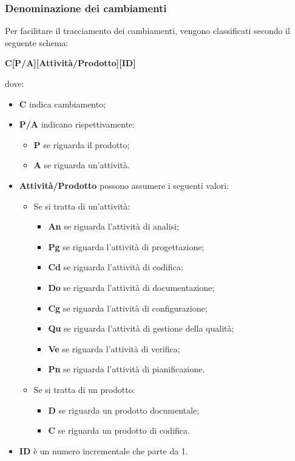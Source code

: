 \subsubsection{Denominazione dei cambiamenti}\label{NomeCambiamenti}
Per facilitare il tracciamento dei cambiamenti, vengono classificati secondo il seguente schema:
\begin{center}
	\textbf{C[P/A][Attività/Prodotto][ID]}
\end{center} 
dove:
\begin{itemize}
	\item \textbf{C} indica cambiamento;
	\item \textbf{P/A} indicano rispettivamente:
	\begin{itemize}
		\item \textbf{P} se riguarda il prodotto;
		\item \textbf{A} se riguarda un'attività.
	\end{itemize}
	\item \textbf{Attività/Prodotto} possono assumere i seguenti valori:
	\begin{itemize}
		\item Se si tratta di un'attività:
		\begin{itemize}
			\item \textbf{An} se riguarda l'attività di analisi;
			\item \textbf{Pg} se riguarda l'attività di progettazione;
			\item \textbf{Cd} se riguarda l'attività di codifica;
			\item \textbf{Do} se riguarda l'attività di documentazione;
			\item \textbf{Cg} se riguarda l'attività di configurazione;
			\item \textbf{Qu} se riguarda l'attività di gestione della qualità;
			\item \textbf{Ve} se riguarda l'attività di verifica;
			\item \textbf{Pn} se riguarda l'attività di pianificazione.
		\end{itemize}
		\item Se si tratta di un prodotto:
		\begin{itemize}
			\item \textbf{D} se riguarda un prodotto documentale;
			\item \textbf{C} se riguarda un prodotto di codifica.
		\end{itemize}
	\end{itemize}
	\item \textbf{ID} è un numero incrementale che parte da 1.
\end{itemize}
